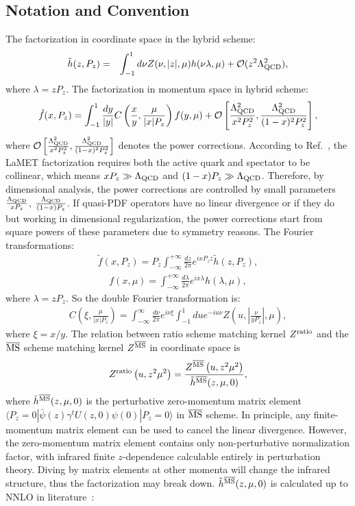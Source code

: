 \documentclass[prd,aps,twocolumn,preprintnumbers, showpacs, nofootinbib,superscriptaddress,notitlepage]{revtex4-2}
\def\bea{\begin{eqnarray}}
\def\eea{\end{eqnarray}}
\begin{document}
\subsection{Notation and Convention}
The factorization in coordinate space in the hybrid scheme:
\bea
\tilde{h}(z, P_{z})= &&\int_{-1}^{1} d\nu Z(\nu,|z|,\mu) h(\nu\lambda,\mu) + {\cal O}(z^2 \Lambda_{\rm QCD}^2), 
\eea
where $\lambda = z P_z$. The factorization in momentum space in hybrid scheme:
\bea
\tilde{f}(x, P_{z}) = \int_{-1}^{1} \frac{dy}{\left| y \right|} C\left(\frac{x}{y},\frac{\mu}{|x|P_{z}}\right) f(y, \mu) + {\cal O}\left[\frac{\Lambda_{\rm QCD}^2}{x^2 P_{z}^2}, \frac{\Lambda_{\rm QCD}^2}{(1-x)^2 P_{z}^2}\right],
\eea
where ${\cal O}\left[\frac{\Lambda_{\rm QCD}^2}{x^2 P_{z}^2}, \frac{\Lambda_{\rm QCD}^2}{(1-x)^2 P_{z}^2}\right]$ denotes the power corrections. According to Ref.~\cite{Ji:2020brr,Ji:2020ect}, the LaMET factorization requires both the active quark and spectator to be collinear, which means $x P_z \gg \Lambda_{\rm QCD}$ and $(1-x)P_z \gg \Lambda_{\rm QCD}$. Therefore, by dimensional analysis, 
the power corrections are controlled by small parameters 
$\frac{\Lambda_{\rm QCD}}{x P_{z}}$, $\frac{\Lambda_{\rm QCD}}{(1-x) P_{z}}$. If quasi-PDF operators have no linear divergence or if they do but working in dimensional regularization, the power
corrections start from square powers of these parameters due to symmetry reasons. The Fourier transformations:
\bea
\tilde{f}(x, P_{z}) = P_z \int_{-\infty}^{+\infty} \frac{d z}{2 \pi} e^{i x P_z z} \tilde{h}(z, P_{z}),
\eea
\bea
f(x,\mu) = \int_{-\infty}^{+\infty} \frac{d \lambda}{2 \pi} e^{i x \lambda} h(\lambda, \mu),
\eea
where $\lambda = z P_z$. So the double Fourier transformation is:
\bea\label{eq:doubleFT2}
C\left(\xi, \frac{\mu}{|x| P_{z}}\right) = \int_{-\infty}^{\infty} \frac{d \nu}{2 \pi} e^{i \nu \xi} \int_{-1}^{1} d u e^{-i u \nu} Z\left(u,\left|\frac{\nu}{y P_{z}}\right|, \mu\right),
\eea
where $\xi=x/y$. The relation between ratio scheme matching kernel $Z^{\rm ratio}$ and the $\overline{\rm MS}$ scheme matching kernel $Z^{\overline{\rm MS}}$ in coordinate space is
\bea\label{eq:ratioMSbar}
Z^{\rm ratio}\left(u,z^{2} \mu^{2}\right)=\frac{Z^{\overline{\rm MS}}\left(u,z^{2} \mu^{2}\right)}{\tilde{h}^{\overline{\rm MS}}(z, \mu, 0)},
\eea
where $\tilde{h}^{\overline{\rm MS}}(z, \mu, 0)$ is the perturbative zero-momentum matrix element $\langle P_z=0 | \bar{\psi}(z) \gamma^{t} U(z,0) \psi (0) |P_z=0 \rangle$ in $\overline{\rm MS}$ scheme. In principle, any finite-momentum matrix element can be used
to cancel the linear divergence. However, the zero-momentum matrix element contains only non-perturbative normalization factor, with infrared finite $z$-dependence calculable entirely in perturbation theory. Diving by matrix elements at other momenta will change the infrared structure, thus the factorization may break down. $\tilde{h}^{\overline{\rm MS}}(z, \mu, 0)$ is calculated up to NNLO in literature~\cite{Li:2020xml}:
\end{document}
